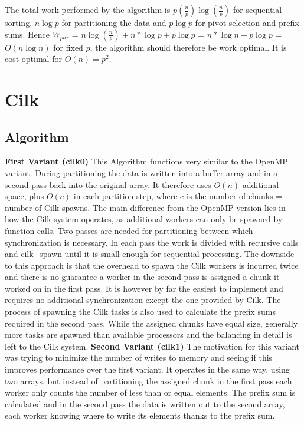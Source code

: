\documentclass[12pt,a4paper]{article}
\begin{document}
The total work performed by the algorithm is $p(\frac{n}{p})\log(\frac{n}{p})$ for sequential sorting, $n\log p$ for partitioning the data and $p\log p$ for pivot selection and prefix sums. Hence $W_{par}$ = $n\log(\frac{n}{p}) + n*\log p + p\log p$ = $n*\log n + p\log p$ = $O(n\log n)$ for fixed $p$, the algorithm should therefore be work optimal. It is cost optimal for $O(n) = p^2$.


\section{Cilk}
\subsection{Algorithm}
\textbf{First Variant (cilk0)}\newline
This Algorithm functions very similar to the OpenMP variant. During partitioning the data is written into a buffer array and in a second pass back into the original array. It therefore uses $O(n)$ additional space, plus $O(c)$ in each partition step, where c is the number of chunks = number of Cilk spawns. 
The main difference from the OpenMP version lies in how the Cilk system operates, as additional workers can only be spawned by function calls. Two passes are needed for partitioning between which synchronization is necessary. In each pass the work is divided with recursive calls and cilk\_spawn until it is small enough for sequential processing. The downside to this approach is that the overhead to spawn the Cilk workers is incurred twice and there is no guarantee a worker in the second pass is assigned a chunk it worked on in the first pass. It is however by far the easiest to implement and requires no additional synchronization except the one provided by Cilk. The process of spawning the Cilk tasks is also used to calculate the prefix sums required in the second pass. While the assigned chunks have equal size, generally more tasks are spawned than available processors and the balancing in detail is left to the Cilk system.
\newline\newline
\textbf{Second Variant (cilk1)}\newline
The motivation for this variant was trying to minimize the number of writes to memory and seeing if this improves performance over the first variant. It operates in the same way, using two arrays, but instead of partitioning the assigned chunk in the first pass each worker only counts the number of less than or equal elements. The prefix sum is calculated and in the second pass the data is written out to the second array, each worker knowing where to write its elements thanks to the prefix sum. 
\end{document}
